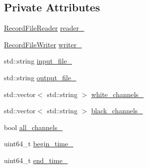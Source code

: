 \subsection*{Private Attributes}
\begin{DoxyCompactItemize}
\item 
\hyperlink{classapollo_1_1cyber_1_1record_1_1RecordFileReader}{Record\-File\-Reader} \hyperlink{classapollo_1_1cyber_1_1record_1_1Spliter_a351a1c5951faa655ff8dc2d62df2ddd2}{reader\-\_\-}
\item 
\hyperlink{classapollo_1_1cyber_1_1record_1_1RecordFileWriter}{Record\-File\-Writer} \hyperlink{classapollo_1_1cyber_1_1record_1_1Spliter_a5e54bcc255461637063eb009d996eb13}{writer\-\_\-}
\item 
std\-::string \hyperlink{classapollo_1_1cyber_1_1record_1_1Spliter_a89fb7f9eb2c160cf551f35596f63faab}{input\-\_\-file\-\_\-}
\item 
std\-::string \hyperlink{classapollo_1_1cyber_1_1record_1_1Spliter_ae195d1ebeae3231a70a07b4272314c02}{output\-\_\-file\-\_\-}
\item 
std\-::vector$<$ std\-::string $>$ \hyperlink{classapollo_1_1cyber_1_1record_1_1Spliter_a292e3b4cad0f53665ed2b770b45dd3f1}{white\-\_\-channels\-\_\-}
\item 
std\-::vector$<$ std\-::string $>$ \hyperlink{classapollo_1_1cyber_1_1record_1_1Spliter_a58fe5f811577bc049f641c48a9cfa593}{black\-\_\-channels\-\_\-}
\item 
bool \hyperlink{classapollo_1_1cyber_1_1record_1_1Spliter_a5e1a7e3013fd68c853a904eb424016ab}{all\-\_\-channels\-\_\-}
\item 
uint64\-\_\-t \hyperlink{classapollo_1_1cyber_1_1record_1_1Spliter_a418a6f11f930dfc5eaa5042574dd4d1f}{begin\-\_\-time\-\_\-}
\item 
uint64\-\_\-t \hyperlink{classapollo_1_1cyber_1_1record_1_1Spliter_a365d80c06ce58ce2d4bd8b8d696356f1}{end\-\_\-time\-\_\-}
\end{DoxyCompactItemize}


